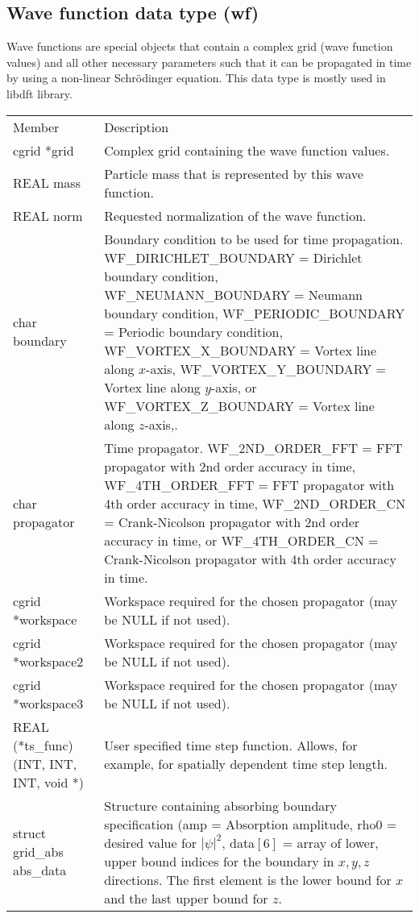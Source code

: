 \documentclass[12pt,letterpaper]{report}
\begin{document}
\subsection{Wave function data type (wf)}

Wave functions are special objects that contain a complex grid (wave function values) and all other necessary parameters such that it can be propagated in time by using a non-linear Schr\"odinger equation. This data type is mostly used in libdft library.

\begin{longtable}{p{} p{}}
Member & Description\\
\cline{1-2}
cgrid *grid & Complex grid containing the wave function values.\\
REAL mass & Particle mass that is represented by this wave function.\\
REAL norm & Requested normalization of the wave function.\\
char boundary & Boundary condition to be used for time propagation. WF\_DIRICHLET\_BOUNDARY = Dirichlet boundary condition, WF\_NEUMANN\_BOUNDARY = Neumann boundary condition, WF\_PERIODIC\_BOUNDARY = Periodic boundary condition, WF\_VORTEX\_X\_BOUNDARY = Vortex line along $x$-axis, WF\_VORTEX\_Y\_BOUNDARY = Vortex line along $y$-axis, or WF\_VORTEX\_Z\_BOUNDARY = Vortex line along $z$-axis,.\\
char propagator & Time propagator. WF\_2ND\_ORDER\_FFT = FFT propagator with 2nd order accuracy in time, WF\_4TH\_ORDER\_FFT = FFT propagator with 4th order accuracy in time, WF\_2ND\_ORDER\_CN = Crank-Nicolson propagator with 2nd order accuracy in time, or WF\_4TH\_ORDER\_CN = Crank-Nicolson propagator with 4th order accuracy in time.\\
cgrid *workspace & Workspace required for the chosen propagator (may be NULL if not used).\\
cgrid *workspace2 & Workspace required for the chosen propagator (may be NULL if not used).\\
cgrid *workspace3 & Workspace required for the chosen propagator (may be NULL if not used).\\
REAL (*ts\_func)(INT, INT, INT, void *) & User specified time step function. Allows, for example, for spatially dependent time step length.\\
struct grid\_abs abs\_data & Structure containing absorbing boundary specification (amp = Absorption amplitude, rho0 = desired value for $|\psi|^2$, data$[6]$ = array of lower, upper bound indices for the boundary in $x, y, z$ directions. The first element is the lower bound for $x$ and the last upper bound for $z$.\\
\end{longtable}
\end{document}
